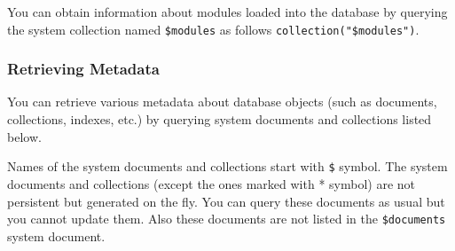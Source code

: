 \documentclass[a4paper,12pt]{article}
\begin{document}
You can obtain information about modules loaded into the database by querying
the system collection named \verb!$modules! as follows
\verb!collection("$modules")!.


\subsubsection{Retrieving Metadata}
\label{managing-metadata}

You can retrieve various metadata about database objects (such as documents,
collections, indexes, etc.) by querying system documents and collections listed
below.

Names of the system documents and collections start with \verb!$! symbol. The
system documents and collections (except the ones marked with * symbol) are not
persistent but generated on the fly. You can query these documents as usual but
you cannot update them. Also these documents are not listed in the
\verb!$documents! system document.
\end{document}
